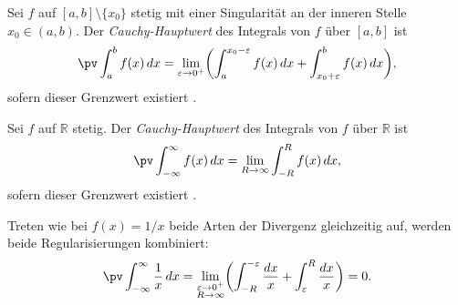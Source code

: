 \begin{definition}
\label{hauptwert:definition:pol}
Sei $f$ auf $[a,b]\setminus\{x_0\}$ stetig mit einer Singularität
an der inneren Stelle $x_0 \in (a,b)$.
Der \emph{Cauchy-Hauptwert} des Integrals von $f$ über $[a,b]$ ist
\begin{equation*}
\pv\int_a^b f(x)\,dx
= \lim_{\varepsilon\to 0^+}
\biggl(
\int_a^{x_0-\varepsilon} f(x)\,dx + \int_{x_0+\varepsilon}^{b} f(x)\,dx
\biggr),
\end{equation*}
sofern dieser Grenzwert existiert
\cite{hauptwert:legua-sanchezruiz}.
\end{definition}

\begin{definition}
\label{hauptwert:definition:unendlich}
Sei $f$ auf $\mathbb{R}$ stetig.
Der \emph{Cauchy-Hauptwert} des Integrals von $f$ über $\mathbb{R}$ ist
\begin{equation*}
\pv\int_{-\infty}^{\infty} f(x)\,dx
= \lim_{R\to\infty} \int_{-R}^{R} f(x)\,dx,
\end{equation*}
sofern dieser Grenzwert existiert
\cite{hauptwert:legua-sanchezruiz}.
\end{definition}

Treten wie bei $f(x) = 1/x$ beide Arten der Divergenz gleichzeitig auf,
werden beide Regularisierungen kombiniert:
\begin{equation}
\pv\int_{-\infty}^{\infty} \frac{1}{x}\,dx
= \lim_{\substack{\varepsilon\to 0^+\\ R\to\infty}}
\biggl(
\int_{-R}^{-\varepsilon} \frac{dx}{x} + \int_{\varepsilon}^{R} \frac{dx}{x}
\biggr)
= 0.
\label{hauptwert:equation:kombiniert}
\end{equation}
